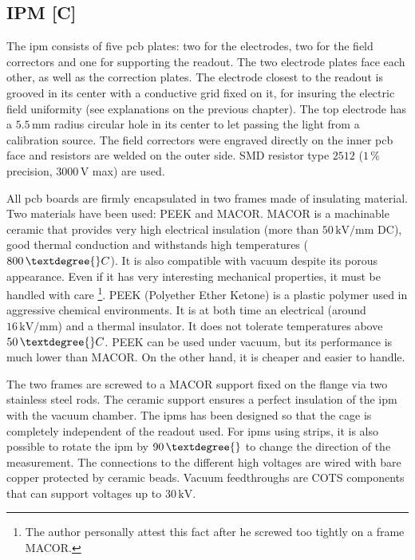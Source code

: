 \begin{refsection}
  \subsection{IPM [C]}
  
  The \acrshort{ipm} consists of five \acrshort{pcb} plates: two for the electrodes, two for the field correctors and one for supporting the readout. The two electrode plates face each other, as well as the correction plates. The electrode closest to the readout is grooved in its center with a conductive grid fixed on it, for insuring the electric field uniformity (see explanations on the previous chapter). The top electrode has a $5.5\,\mathrm{mm}$ radius circular hole in its center to let passing the light from a calibration source. The field correctors were engraved directly on the inner \acrshort{pcb} face and resistors are welded on the outer side. SMD resistor type $2512$ ($1\,\mathrm{\%}$ precision, $3000\,\mathrm{V}$ max) are used.

  All \acrshort{pcb} boards are firmly encapsulated in two frames made of insulating material. Two materials have been used: PEEK and MACOR. MACOR is a machinable ceramic that provides very high electrical insulation (more than $50\,\mathrm{kV/mm}$ DC), good thermal conduction and withstands high temperatures ($800\,\textdegree{}C$). It is also compatible with vacuum despite its porous appearance. Even if it has very interesting mechanical properties, it must be handled with care \footnote{The author personally attest this fact after he screwed too tightly on a frame MACOR.}. PEEK (Polyether Ether Ketone) is a plastic polymer used in aggressive chemical environments. It is at both time an electrical (around $16\,\mathrm{kV/mm}$) and a thermal insulator. It does not tolerate temperatures above $50\,\textdegree{}C$. PEEK can be used under vacuum, but its performance is much lower than MACOR. On the other hand, it is cheaper and easier to handle.

  The two frames are screwed to a MACOR support fixed on the flange via two stainless steel rods. The ceramic support ensures a perfect insulation of the \acrshort{ipm} with the vacuum chamber. The \acrshort{ipm}s has been designed so that the cage is completely independent of the readout used. For \acrshort{ipm}s using strips, it is also possible to rotate the \acrshort{ipm} by $90\,\textdegree{}$ to change the direction of the measurement. The connections to the different high voltages are wired with bare copper protected by ceramic beads. Vacuum feedthroughs are COTS components that can support voltages up to $30\,\mathrm{kV}$.


\end{refsection}
